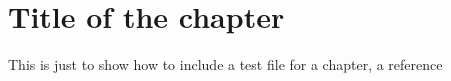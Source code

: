 \chapter{Title of the chapter}
This is just to show how to include a test file for a chapter, a reference \cite{ledesma_scree_2015}